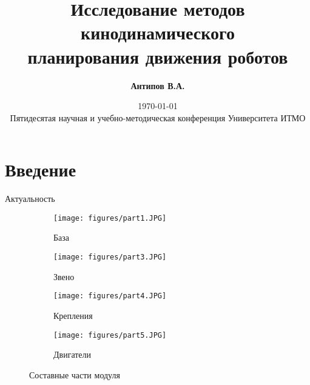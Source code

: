 \documentclass[11pt, aspectratio=169]{beamer}
\title{\centering Исследование методов кинодинамического\\ планирования движения роботов}
\author[Author, Another]{
    \hfill
    {\bf Антипов В.А.}\inst{1}
    \hfill
}
\institute[ITMO University] %
{
    \hfill
    \begin{minipage}[t]{0.4\textwidth}
        \centering{\inst{1}%
        ITMO University}
    \end{minipage}
    \hfill
 }
\date[Occasion]{\today \\ Пятидесятая научная и учебно-методическая конференция Университета ИТМО}
\begin{document}
\frame{\titlepage}

\section{Введение}
% 
\begin{frame}{Актуальность}
    \begin{figure}[ht]
        \begin{subfigure}[b]{0.48\textwidth}
             \centering
             \texttt{[image: figures/part1.JPG]}
             \caption{База}
             \label{fig:rozum}
         \end{subfigure}
         \hfill
         \begin{subfigure}[b]{0.48\textwidth}
             \centering
             \texttt{[image: figures/part3.JPG]}
             \caption{Звено}
             \label{fig:ur}
         \end{subfigure}
         \hfill
         \begin{subfigure}[b]{0.48\textwidth}
             \centering
             \texttt{[image: figures/part4.JPG]}
             \caption{Крепления}
             \label{fig:xarm}
         \end{subfigure}
         \hfill
         \begin{subfigure}[b]{0.48\textwidth}
             \centering
             \texttt{[image: figures/part5.JPG]}
             \caption{Двигатели}
             \label{fig:xarm}
         \end{subfigure}
         \caption{Составные части модуля}
    \end{figure}

\end{frame}

    
\end{document}
